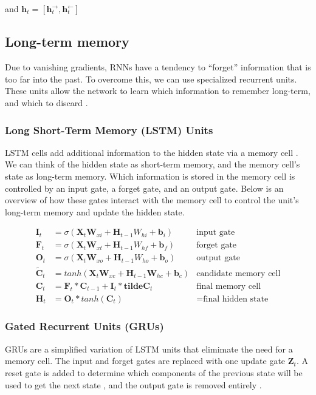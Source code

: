 \documentclass{article}
\begin{document}
and \(\bm{h}_t=[\bm{h}^\rightarrow_t, \bm{h}^\leftarrow_t]\)

\subsection{Long-term memory}

Due to vanishing gradients, RNNs have a tendency to ``forget'' information that is too far into the past. To overcome this, we can use specialized recurrent units. These units allow the network to learn which information to remember long-term, and which to discard \cite{hands-on-ml}.

\subsubsection{Long Short-Term Memory (LSTM) Units}

LSTM cells add additional information to the hidden state via a memory cell \cite{pml1book}. We can think of the hidden state as short-term memory, and the memory cell's state as long-term memory. Which information is stored in the memory cell is controlled by an input gate, a forget gate, and an output gate. Below is an overview of how these gates interact with the memory cell to control the unit's long-term memory and update the hidden state.

\begin{align*}
    \bm{I}_t &= \sigma(\bm{X}_t\bm{W}_{xi} + \bm{H}_{t-1}W_{hi} + \bm{b}_i) & \text{input gate} \\
    \bm{F}_t &= \sigma(\bm{X}_t\bm{W}_{xt} + \bm{H}_{t-1}W_{hf} + \bm{b}_f) & \text{forget gate} \\
    \bm{O}_t &= \sigma(\bm{X}_t\bm{W}_{xo} + \bm{H}_{t-1}W_{ho} + \bm{b}_o) & \text{output gate} \\
    \bm{\tilde{C}}_t &= tanh(\bm{X}_t\bm{W}_{xc} + \bm{H}_{t-1}\bm{W}_{hc} +\bm{b}_c) & \text{candidate memory cell} \\
    \bm{C}_t &= \bm{F}_t * \bm{C}_{t-1} + \bm{I}_t * \bm{tilde{C}}_t & \text{final memory cell} \\
    \bm{H}_t &= \bm{O}_t * tanh(\bm{C}_t) &= \text{final hidden state}
\end{align*}

\subsubsection{Gated Recurrent Units (GRUs)}

GRUs are a simplified variation of LSTM units that elimimate the need for a memory cell. The input and forget gates are replaced with one update gate \(\bm{Z}_t\). A reset gate is added to determine which components of the previous state will be used to get the next state \cite{hands-on-ml}, and the output gate is removed entirely \cite{pml1book}.
\end{document}
